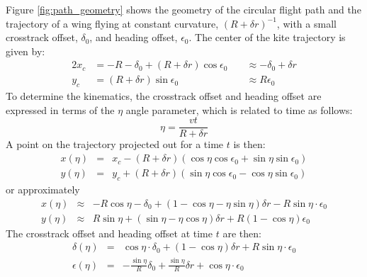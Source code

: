 \documentclass{article} %
\begin{document}
%
Figure \ref{fig:path_geometry} shows the geometry of the circular
flight path and the trajectory of a wing flying at constant curvature,
$(R + \delta r)^{-1}$, with a small crosstrack offset, $\delta_0$, and
heading offset, $\epsilon_0$.  The center of the kite trajectory is
given by:
\begin{alignat}{2}
x_c &= -R - \delta_0 + (R + \delta r) \cos \epsilon_0
& \; &\approx -\delta_0 + \delta r \\
y_c &= (R + \delta r) \sin \epsilon_0 & \; &\approx R \epsilon_0
\end{alignat}
%
To determine the kinematics, the crosstrack offset and heading offset
are expressed in terms of the $\eta$ angle parameter, which is related
to time as follows:
%
\begin{equation}
\eta = \frac{v t}{R + \delta r}
\end{equation}
%
A point on the trajectory projected out for a time $t$ is then:
\begin{eqnarray}
x(\eta) &=& x_c - (R + \delta r)
(\cos \eta \cos \epsilon_0 + \sin \eta \sin \epsilon_0) \\
y(\eta) &=& y_c + (R + \delta r)
(\sin \eta \cos \epsilon_0 - \cos \eta \sin \epsilon_0)
\end{eqnarray}
or approximately
\begin{eqnarray}
x(\eta) &\approx&
-R \cos \eta - \delta_0 + (1 - \cos \eta - \eta \sin \eta) \delta r -
R \sin \eta \cdot \epsilon_0 \\
y(\eta) &\approx& R \sin \eta + (\sin \eta - \eta \cos \eta) \delta r +
R (1 - \cos \eta) \epsilon_0
\end{eqnarray}
%
The crosstrack offset and heading offset at time $t$ are then:
%
\begin{eqnarray}
\delta(\eta) &=& \cos \eta \cdot \delta_0 + (1 - \cos \eta) \delta r +
R \sin \eta \cdot \epsilon_0
\label{eqn:delta_eta} \\
\epsilon(\eta) &=& -\frac{\sin \eta}{R} \delta_0 + \frac{\sin \eta}{R} \delta r +
\cos \eta \cdot \epsilon_0
\label{eqn:epsilon_eta}
\end{eqnarray}
\end{document}
